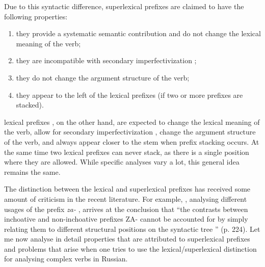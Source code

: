 Due to this syntactic difference, superlexical prefixes  are claimed to have the following properties:
\begin{enumerate}
\item they provide a systematic semantic contribution and do not change the lexical meaning of the verb;
\item they are incompatible with secondary imperfectivization ;
\item they do not change the argument structure of the verb;
\item they appear to the left of the lexical prefixes  (if two or more prefixes are stacked). 
\end{enumerate}

lexical prefixes , on the other hand, are expected to change the lexical meaning of the verb, allow for secondary imperfectivization , change the argument structure of the verb, and always appear closer to the stem when prefix stacking  occurs. At the same time two lexical prefixes  can never stack, as there is a single position where they are allowed. While specific analyses vary a lot, this general idea remains the same. 

The distinction between the lexical and superlexical prefixes  has received some amount of criticism in the recent literature. For example, \citet{Braginsky:08}, analysing different usages of the prefix \textit{za-} , arrives at the conclusion that ``the contrasts
between inchoative  and non-inchoative  prefixes ZA- cannot be accounted for by
simply relating them to different structural positions on the syntactic tree '' (p. 224). Let me now analyse in detail properties that are attributed to superlexical prefixes  and problems that arise when one tries to use the lexical/superlexical distinction for analysing complex verbs  in Russian.


